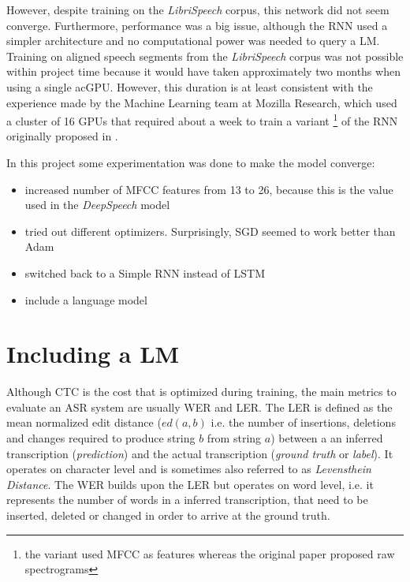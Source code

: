However, despite training on the \textit{LibriSpeech} corpus, this network did not seem converge. Furthermore, performance was a big issue, although the \ac{RNN} used a simpler architecture and no computational power was needed to query a \ac{LM}. Training on aligned speech segments from the \textit{LibriSpeech} corpus was not possible within project time because it would have taken approximately two months when using a single ac{GPU}. However, this duration is at least consistent with the experience made by the Machine Learning team at Mozilla Research, which used a cluster of 16 \acsp{GPU} that required about a week \cite{mozillajourney} to train a variant \footnote{the variant used \ac{MFCC} as features whereas the original paper proposed raw spectrograms} of the \ac{RNN} originally proposed in \cite{ctc_paper}.

In this project some experimentation was done to make the model converge:

\begin{itemize}
	\item increased number of MFCC features from 13 to 26, because this is the value used in the \textit{DeepSpeech} model
	\item tried out different optimizers. Surprisingly, SGD seemed to work better than Adam
	\item switched back to a Simple RNN instead of LSTM
	\item include a language model
\end{itemize}

\section{Including a \ac{LM}}

Although \ac{CTC} is the cost that is optimized during training, the main metrics to evaluate an \ac{ASR} system are usually \ac{WER} and \ac{LER}. The \ac{LER} is defined as the mean normalized edit distance ($ed(a, b)$ i.e. the number of insertions, deletions and changes required to produce string $b$ from string $a$) between a an inferred transcription (\textit{prediction}) and the actual transcription (\textit{ground truth} or \textit{label}). It operates on character level and is sometimes also referred to as \textit{Levensthein Distance}. The \ac{WER} builds upon the \ac{LER} but operates on word level, i.e. it represents the number of words in a inferred transcription, that need to be inserted, deleted or changed in order to arrive at the ground truth.

